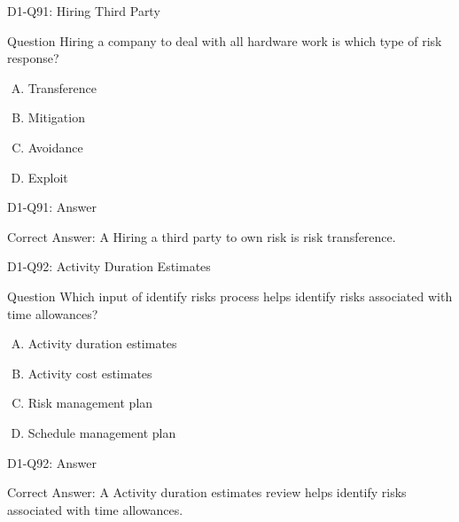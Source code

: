 \documentclass{beamer}
\begin{document}
	\begin{frame}{D1-Q91: Hiring Third Party}
		\begin{block}{Question}
			Hiring a company to deal with all hardware work is which type of risk response?
		\end{block}
		\begin{enumerate}[(A)]
			\item Transference
			\item Mitigation
			\item Avoidance
			\item Exploit
		\end{enumerate}
	\end{frame}
	\begin{frame}{D1-Q91: Answer}
		\begin{block}{Correct Answer: A}
			Hiring a third party to own risk is risk transference.
		\end{block}
	\end{frame}
	
	\begin{frame}{D1-Q92: Activity Duration Estimates}
		\begin{block}{Question}
			Which input of identify risks process helps identify risks associated with time allowances?
		\end{block}
		\begin{enumerate}[(A)]
			\item Activity duration estimates
			\item Activity cost estimates
			\item Risk management plan
			\item Schedule management plan
		\end{enumerate}
	\end{frame}
	\begin{frame}{D1-Q92: Answer}
		\begin{block}{Correct Answer: A}
			Activity duration estimates review helps identify risks associated with time allowances.
		\end{block}
	\end{frame}
	
\end{document}
